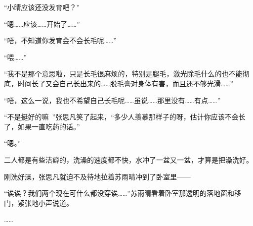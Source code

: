 “小晴应该还没发育吧？”

“嗯……应该……开始了……”

“唔，不知道你发育会不会长毛呢……”

“喂……”

“我不是那个意思啦，只是长毛很麻烦的，特别是腿毛，激光除毛什么的也不能彻底，时间长了又会自己长出来的……脱毛膏对身体有害，而且还不够光滑……”

“唔，这么一说，我也不希望自己长毛呢……虽说……那里没有……有点……”

“不是挺好的嘛~”张思凡笑了起来，“多少人羡慕那样子的呀，估计你应该不会长了，如果一直吃药的话。”

“嗯。”

二人都是有些洁癖的，洗澡的速度都不快，水冲了一盆又一盆，才算是把澡洗好。

刚洗好澡，张思凡就迫不及待地拉着苏雨晴冲到了卧室里——

“诶诶？我们两个现在可什么都没穿诶……”苏雨晴看着卧室那透明的落地窗和移门，紧张地小声说道。

……
